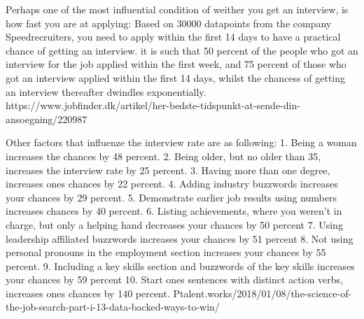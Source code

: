 Perhaps one of the most influential condition of weither you get an interview,
is how fast you are at applying:
Based on 30000 datapoints from the company Speedrecruiters, you need
to apply within the first 14 days to have a practical chance of getting an
interview. it is such that 50 percent of the people who got an interview
for the job applied within the first week, and 75 percent of those who
got an interview applied within the first 14 days, whilst the chancess of
getting an interview thereafter dwindles exponentially.
https://www.jobfinder.dk/artikel/her-bedste-tidspunkt-at-sende-din-ansoegning/220987

Other factors that influenze the interview rate are as following:
1. Being a woman increases the chances by 48 percent.
2. Being older, but no older than 35, increases the interview rate by 25 percent.
3. Having more than one degree, increases ones chances by 22 percent.
4. Adding industry buzzwords increases your chances by 29 percent.
5. Demonstrate earlier job results using numbers increases chances by 40 percent.
6. Listing achievements, where you weren't in charge, but only a helping hand
 decreases your chances by 50 percent
7. Using leadership affiliated buzzwords increases your chances by 51 percent
8. Not using personal pronouns in the employment section increases your
chances by 55 percent.
9. Including a key skills section and buzzwords of the key skills increases your
 chances by 59 percent
10. Start ones sentences with distinct action verbs, increases ones chances by 140 percent.
Ptalent.works/2018/01/08/the-science-of-the-job-search-part-i-13-data-backed-ways-to-win/






